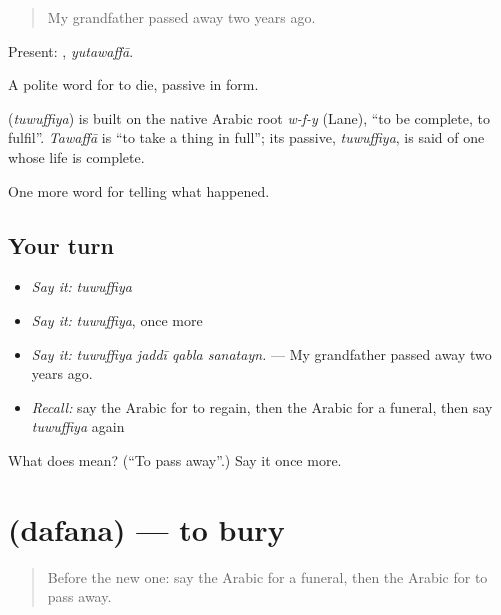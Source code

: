 \begin{quote}
My grandfather passed away two years ago.
\end{quote}

Present: , \emph{yutawaffā}.

A polite word for to die, passive in form.

\begin{cousinweb}
\textbf{} (\emph{tuwuffiya}) is built on the native Arabic root \emph{w-f-y} (Lane), \textquotedblleft{}to be complete, to fulfil\textquotedblright{}. \emph{Tawaffā} is \textquotedblleft{}to take a thing in full\textquotedblright{}; its passive, \emph{tuwuffiya}, is said of one whose life is complete.
\end{cousinweb}

\begin{grammarlens}[title={What you've built}]
One more word for telling what happened.
\end{grammarlens}

\subsection*{Your turn}
\begin{itemize}
\raggedright
  \item \emph{Say it:} \emph{tuwuffiya}
  \item \emph{Say it:} \emph{tuwuffiya}, once more
  \item \emph{Say it:} \emph{tuwuffiya jaddī qabla sanatayn.} — My grandfather passed away two years ago.
  \item \emph{Recall:} say the Arabic for to regain, then the Arabic for a funeral, then say \emph{tuwuffiya} again
\end{itemize}

\begin{tcolorbox}[breakable,colback=teal!4,colframe=teal!35!black,title={Before you move on}]
What does  mean? (\textquotedblleft{}To pass away\textquotedblright{}.) Say it once more.
\end{tcolorbox}
\section[\texorpdfstring{\ar{دفن} (dafana)}{دفن (dafana)}]{ (dafana) — to bury}

\label{lesson:AR-C314-dafana}



\begin{quote}
Before the new one: say the Arabic for a funeral, then the Arabic for to pass away.
\end{quote}


